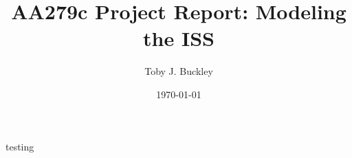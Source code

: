 \documentclass[12pt, letterpaper]{article}
\title{AA279c Project Report: Modeling the ISS}
\author{Toby J. Buckley}
\date{\today}
\begin{document}
\begin{titlepage}
	\maketitle
\end{titlepage}


testing



\end{document}
